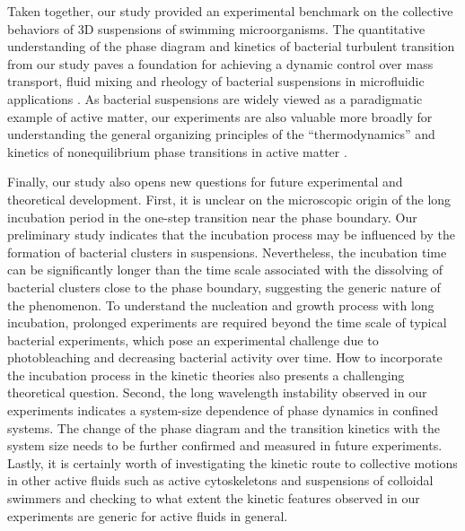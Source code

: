 Taken together, our study provided an experimental benchmark on the collective behaviors of 3D suspensions of swimming microorganisms. The quantitative understanding of the phase diagram and kinetics of bacterial turbulent transition from our study paves a foundation for achieving a dynamic control over mass transport, fluid mixing and rheology of bacterial suspensions in microfluidic applications \cite{Peng2016, Lopez2015}. As bacterial suspensions are widely viewed as a paradigmatic example of active matter, our experiments are also valuable more broadly for understanding the general organizing principles of the ``thermodynamics'' and kinetics of nonequilibrium phase transitions in active matter \cite{Takatori2015}.

Finally, our study also opens new questions for future experimental and theoretical development. First, it is unclear on the microscopic origin of the long incubation period in the one-step transition near the phase boundary. Our preliminary study indicates that the incubation process may be influenced by the formation of bacterial clusters in suspensions. Nevertheless, the incubation time can be significantly longer than the time scale associated with the dissolving of bacterial clusters close to the phase boundary, suggesting the generic nature of the phenomenon. To understand the nucleation and growth process with long incubation, prolonged experiments are required beyond the time scale of typical bacterial experiments, which pose an experimental challenge due to photobleaching and decreasing bacterial activity over time. How to incorporate the incubation process in the kinetic theories also presents a challenging theoretical question. Second, the long wavelength instability observed in our experiments indicates a system-size dependence of phase dynamics in confined systems. The change of the phase diagram and the transition kinetics with the system size needs to be further confirmed and measured in future experiments. Lastly, it is certainly worth
of investigating the kinetic route to collective motions in other active fluids such as active cytoskeletons \cite{Martinez-Prat2019} and suspensions of colloidal swimmers \cite{Bricard2013} and checking to what extent the kinetic features observed in our experiments are generic for active fluids in general.
